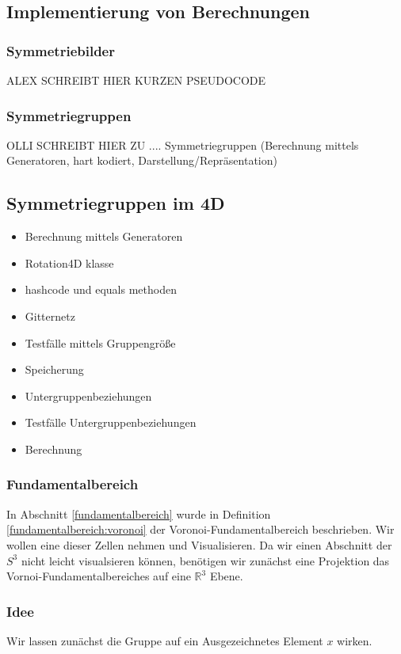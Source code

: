 \subsection{Implementierung von Berechnungen}
    \subsubsection{Symmetriebilder}
        ALEX SCHREIBT HIER KURZEN PSEUDOCODE    
    \subsubsection{Symmetriegruppen}
        OLLI SCHREIBT HIER ZU .... Symmetriegruppen (Berechnung mittels Generatoren, hart kodiert, Darstellung/Repräsentation)
\newpage
\subsection{Symmetriegruppen im 4D}
\begin{itemize}
	\item Berechnung mittels Generatoren
	\item Rotation4D klasse
	\item hashcode und equals methoden
	\item Gitternetz
	\item Testfälle mittels Gruppengröße
	\item Speicherung
	\item Untergruppenbeziehungen
	\item Testfälle Untergruppenbeziehungen
	\item Berechnung
\end{itemize}


    \subsubsection{Fundamentalbereich}
         In Abschnitt \ref{fundamentalbereich} wurde in Definition \ref{fundamentalbereich:voronoi} der Voronoi-Fundamentalbereich beschrieben. Wir wollen eine dieser Zellen
         nehmen und Visualisieren. Da wir einen Abschnitt der $S^3$ nicht leicht visualsieren können, benötigen wir zunächst eine Projektion das Vornoi-Fundamentalbereiches auf
         eine $\mathbb{R}^3$ Ebene.
        \subsubsection*{Idee}
            Wir lassen zunächst die Gruppe auf ein Ausgezeichnetes Element $x$ wirken.

